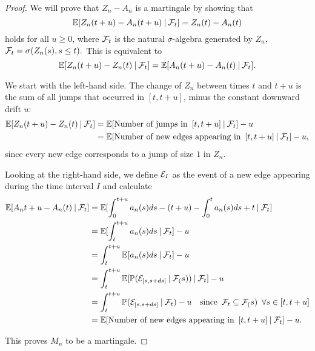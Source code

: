 \begin{proof} \label{P: decomp Zn}
	We will prove that $Z_n - A_n$ is a martingale by showing that
	\begin{equation} \label{E: Mn martingale}
	\mathbb{E}[ Z_n(t+u) - A_n(t+u) \: | \: \mathcal{F}_{t} ] = Z_n(t) - A_n(t)
	\end{equation}
	holds for all $u \geq 0$, where $\mathcal{F}_{t}$ is the natural $\sigma$-algebra generated by $Z_n$, 
	$\mathcal{F}_{t} = \sigma(Z_n(s), s \leq t).$
	This is equivalent to 
	\begin{equation}
	\mathbb{E}[Z_n(t+u) - Z_n(t) \: | \: \mathcal{F}_{t}] = \mathbb{E}[A_n(t+u) - A_n(t) \: | \: \mathcal{F}_{t}].
	\end{equation}
	
	We start with the left-hand side. 
	The change of $Z_n$ between times $t$ and $t+u$ is the sum of all jumps that occurred in $[t, t+u]$,
	minus the constant downward drift $u$:
	\begin{align*}
	\mathbb{E}[Z_n(t+u) - Z_n(t) \: | \: \mathcal{F}_{t}] 
	&= \mathbb{E}[\text{Number of jumps in} \enspace [t, t+u] \: | \: \mathcal{F}_{t}] - u \\
	&= \mathbb{E}[\text{Number of new edges appearing in} \enspace [t, t+u] \: | \: \mathcal{F}_{t}] - u,
	\end{align*}
	since every new edge corresponds to a jump of size $1$ in $Z_n$.
	
	Looking at the right-hand side, we define $\mathcal{E}_{I}$ as the event of a new edge appearing during the time interval $I$ and calculate
	\begin{align*}
	\mathbb{E}[A_n{t+u} - A_n(t) \: | \: \mathcal{F}_{t}]
	&= \mathbb{E}[ \int_{0}^{t+u} a_n(s)ds - (t+u) - \int_{0}^{t} a_n(s)ds + t \: | \: \mathcal{F}_{t} ] \\
	&= \mathbb{E}[ \int_{t}^{t+u} a_n(s)ds \: | \: \mathcal{F}_{t} ] - u \\
	&= \int_{t}^{t+u} \mathbb{E}[a_n(s)ds \: | \: \mathcal{F}_{t}] - u \\
	&= \int_{t}^{t+u} \mathbb{E}[ \mathbb{P}(\mathcal{E}_{[s, s+ds]} \: | \: \mathcal{F}_{(}s)) \: | \: \mathcal{F}_{t} ] - u\\
	&= \int_{t}^{t+u} \mathbb{P}( \mathcal{E}_{[s, s+ds]} \: | \: \mathcal{F}_{t} ) - u
	\quad \text{since} \enspace \mathcal{F}_{t} \subseteq \mathcal{F}_{(}s) \enspace \forall s \in [t,t+u] \\
	&= \mathbb{E}[\text{Number of new edges appearing in} \enspace [t, t+u] \: | \: \mathcal{F}_{t}] - u.
	\end{align*}
	
	This proves $M_n$ to be a martingale. 	
\end{proof}

